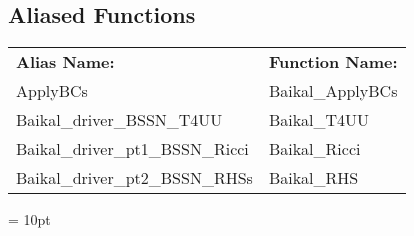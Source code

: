 \subsection*{Aliased Functions}

\hspace{5mm}

 \begin{tabular*}{160mm}{ll} 

{\bf Alias Name:} ~~~~~~~ & {\bf Function Name:} \\ 
ApplyBCs & Baikal\_ApplyBCs \\ 
Baikal\_driver\_BSSN\_T4UU & Baikal\_T4UU \\ 
Baikal\_driver\_pt1\_BSSN\_Ricci & Baikal\_Ricci \\ 
Baikal\_driver\_pt2\_BSSN\_RHSs & Baikal\_RHS \\ 
\end{tabular*} 



\vspace{5mm}\parskip = 10pt 


